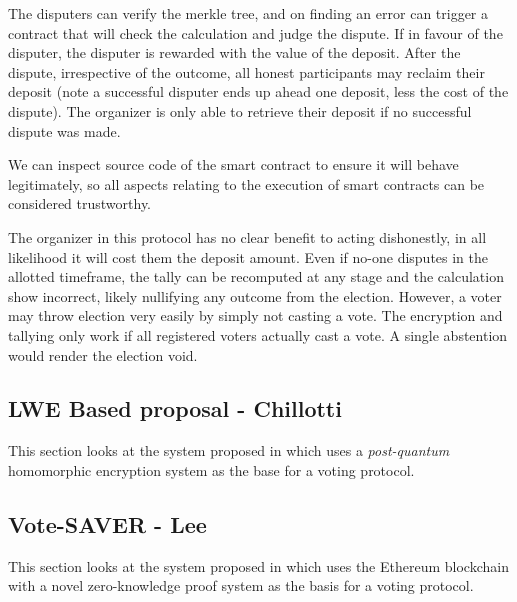 The disputers can verify the merkle tree, and on finding an error can trigger a contract that will check the calculation and judge the dispute. If in favour of the disputer, the disputer is rewarded with the value of the deposit. After the dispute, irrespective of the outcome, all honest participants may reclaim their deposit (note a successful disputer ends up ahead one deposit, less the cost of the dispute). The organizer is only able to retrieve their deposit if no successful dispute was made.

We can inspect source code of the smart contract to ensure it will behave legitimately, so all aspects relating to the execution of smart contracts can be considered trustworthy.

The organizer in this protocol has no clear benefit to acting dishonestly, in all likelihood it will cost them the deposit amount. Even if no-one disputes in the allotted timeframe, the tally can be recomputed at any stage and the calculation show incorrect, likely nullifying any outcome from the election. However, a voter may throw election very easily by simply not casting a vote. The encryption and tallying only work if all registered voters actually cast a vote. A single abstention would render the election void.




\subsection{LWE Based proposal - Chillotti}

This section looks at the system proposed in \cite{chillottiHomomorphicLWEBased} which uses a \emph{post-quantum} homomorphic encryption system as the base for a voting protocol.


\subsection{Vote-SAVER - Lee}

This section looks at the system proposed in \cite{leeSAVERSNARKfriendlyAdditivelyhomomorphic2019} which uses the Ethereum blockchain with a novel zero-knowledge proof system as the basis for a voting protocol.


